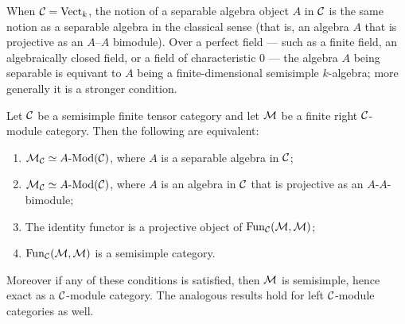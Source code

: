 \documentclass{amsart}
\begin{document}
\begin{remark}
	When $\mathcal C = \mathrm{Vect}_k$, the notion of a separable algebra object $A$ in $\mathcal C$ is the same notion as a separable algebra in the classical sense (that is, an algebra $A$ that is projective as an $A$--$A$ bimodule). Over a perfect field --- such as a finite field, an algebraically closed field, or a field of characteristic $0$ --- the algebra $A$ being separable is equivant to $A$ being a finite-dimensional semisimple $k$-algebra; more generally it is a stronger condition. 
\end{remark}

\begin{theorem} \label{thm:SepModCats}
	Let $\mathcal C$ be a  semisimple finite tensor category and let $\mathcal M$ be a finite right $\mathcal C$-module category. Then the following are equivalent:
	\begin{enumerate}
		\item $\cM_\cC \simeq \Mod{A}{}(\cC)$, where $A$ is a separable algebra in $\mathcal C$;
		\item $\cM_\cC \simeq \Mod{A}{}(\cC)$, where $A$ is an algebra in $\mathcal C$ that is projective as an $A$-$A$-bimodule;
		\item The identity functor is a projective object of $\operatorname{Fun}_\mathcal C(\mathcal M, \mathcal M)$;
		\item $\operatorname{Fun}_\mathcal C(\mathcal M, \mathcal M)$ is a semisimple category. 
	\end{enumerate}
	Moreover if any of these conditions is satisfied, then $\mathcal M$ is semisimple, hence exact as a $\mathcal C$-module category. The analogous results hold for left $\mathcal C$-module categories as well. 
\end{theorem}
\end{document}

